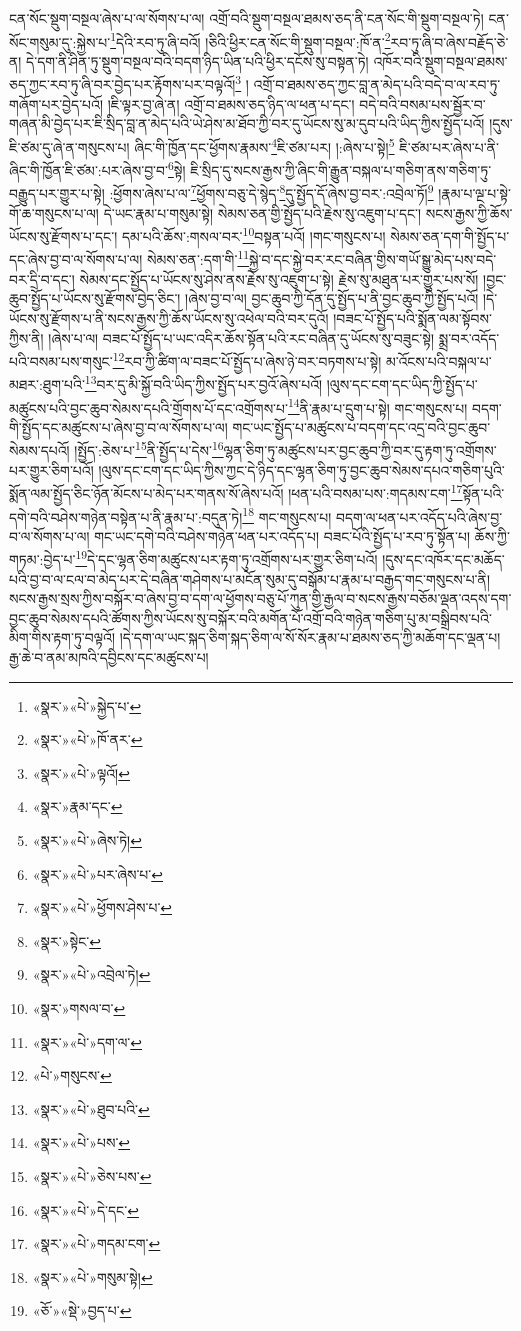 ངན་སོང་སྡུག་བསྔལ་ཞེས་པ་ལ་སོགས་པ་ལ། འགྲོ་བའི་སྡུག་བསྔལ་ཐམས་ཅད་ནི་ངན་སོང་གི་སྡུག་བསྔལ་ཏེ། ངན་སོང་གསུམ་དུ་:སྐྱེས་པ་\footnote{«སྣར་»«པེ་»སྐྱེད་པ་}དེའི་རབ་ཏུ་ཞི་བའོ། །ཅིའི་ཕྱིར་ངན་སོང་གི་སྡུག་བསྔལ་:ཁོ་ན་\footnote{«སྣར་»«པེ་»ཁོ་ནར་}རབ་ཏུ་ཞི་བ་ཞེས་བརྗོད་ཅེ་ན། དེ་དག་ནི་ཤིན་ཏུ་སྡུག་བསྔལ་བའི་བདག་ཉིད་ཡིན་པའི་ཕྱིར་དངོས་སུ་བསྟན་ཏེ། འཁོར་བའི་སྡུག་བསྔལ་ཐམས་ཅད་ཀྱང་རབ་ཏུ་ཞི་བར་བྱེད་པར་རྟོགས་པར་བལྟའོ།\footnote{«སྣར་»«པེ་»ལྟའོ།} །
འགྲོ་བ་ཐམས་ཅད་ཀྱང་བླ་ན་མེད་པའི་བདེ་བ་ལ་རབ་ཏུ་གཞོག་པར་བྱེད་པའོ། །ཇི་ལྟར་བྱ་ཞེ་ན། འགྲོ་བ་ཐམས་ཅད་ཉིད་ལ་ཕན་པ་དང་། བདེ་བའི་བསམ་པས་སྦྱོར་བ་གཞན་མི་བྱེད་པར་ཇི་སྲིད་བླ་ན་མེད་པའི་ཡེ་ཤེས་མ་ཐོབ་ཀྱི་བར་དུ་ཡོངས་སུ་མ་དུབ་པའི་ཡིད་ཀྱིས་སྤྱོད་པའོ། །དུས་ཇི་ཙམ་དུ་ཞེ་ན་གསུངས་པ། ཞིང་གི་ཁྱོན་དང་ཕྱོགས་རྣམས་\footnote{«སྣར་»རྣམ་དང་}ཇི་ཙམ་པར། །:ཞེས་པ་སྟེ།\footnote{«སྣར་»«པེ་»ཞེས་ཏེ།} ཇི་ཙམ་པར་ཞེས་པ་ནི་ཞིང་གི་ཁྱོན་ཇི་ཙམ་:པར་ཞེས་བྱ་བ་\footnote{«སྣར་»«པེ་»པར་ཞེས་པ་}སྟེ། ཇི་སྲིད་དུ་སངས་རྒྱས་ཀྱི་ཞིང་གི་རྒྱུན་བསྐལ་པ་གཅིག་ནས་གཅིག་ཏུ་བརྒྱུད་པར་གྱུར་པ་སྟེ། :ཕྱོགས་ཞེས་པ་ལ་\footnote{«སྣར་»«པེ་»ཕྱོགས་ཤེས་པ་}ཕྱོགས་བཅུ་དེ་སྙེད་\footnote{«སྣར་»སྟེང་}དུ་སྤྱོད་དོ་ཞེས་བྱ་བར་:འབྲེལ་ཏོ།\footnote{«སྣར་»«པེ་»འབྲེལ་ཏེ།} །རྣམ་པ་ལྔ་པ་སྟེ་གོ་ཆ་གསུངས་པ་ལ། དེ་ཡང་རྣམ་པ་གསུམ་སྟེ། སེམས་ཅན་གྱི་སྤྱོད་པའི་རྗེས་སུ་འཇུག་པ་དང་། སངས་རྒྱས་ཀྱི་ཆོས་ཡོངས་སུ་རྫོགས་པ་དང་། དམ་པའི་ཆོས་:གསལ་བར་\footnote{«སྣར་»གསལ་བ་}བསྟན་པའོ། །གང་གསུངས་པ། སེམས་ཅན་དག་གི་སྤྱོད་པ་དང་ཞེས་བྱ་བ་ལ་སོགས་པ་ལ། སེམས་ཅན་:དག་གི་\footnote{«སྣར་»«པེ་»དག་ལ་}སྐྱེ་བ་དང་སྐྱེ་བར་རང་བཞིན་གྱིས་གཡོ་སྒྱུ་མེད་པས་བདེ་བར་དྲི་བ་དང་། སེམས་དང་སྤྱོད་པ་ཡོངས་སུ་ཤེས་ནས་རྗེས་སུ་འཇུག་པ་སྟེ། རྗེས་སུ་མཐུན་པར་གྱུར་པས་སོ། །བྱང་ཆུབ་སྤྱོད་པ་ཡོངས་སུ་རྫོགས་བྱེད་ཅིང་། །ཞེས་བྱ་བ་ལ། བྱང་ཆུབ་ཀྱི་དོན་དུ་སྤྱོད་པ་ནི་བྱང་ཆུབ་ཀྱི་སྤྱོད་པའོ། །དེ་ཡོངས་སུ་རྫོགས་པ་ནི་སངས་རྒྱས་ཀྱི་ཆོས་ཡོངས་སུ་འཕེལ་བའི་བར་དུའོ། །བཟང་པོ་སྤྱོད་པའི་སྨོན་ལམ་སྟོབས་ཀྱིས་ནི། །ཞེས་པ་ལ། བཟང་པོ་སྤྱོད་པ་ཡང་འདིར་ཆོས་སྟོན་པའི་རང་བཞིན་དུ་ཡོངས་སུ་བཟུང་སྟེ། སྨྲ་བར་འདོད་པའི་བསམ་པས་གསུང་\footnote{«པེ་»གསུངས་}རབ་ཀྱི་ཚིག་ལ་བཟང་པོ་སྤྱོད་པ་ཞེས་ཉེ་བར་བཏགས་པ་སྟེ། མ་འོངས་པའི་བསྐལ་པ་མཐར་:ཐུག་པའི་\footnote{«སྣར་»«པེ་»ཐུབ་པའི་}བར་དུ་མི་སྐྱོ་བའི་ཡིད་ཀྱིས་སྤྱོད་པར་བྱའོ་ཞེས་པའོ། །ལུས་དང་ངག་དང་ཡིད་ཀྱི་སྤྱོད་པ་མཚུངས་པའི་བྱང་ཆུབ་སེམས་དཔའི་གྲོགས་པོ་དང་འགྲོགས་པ་\footnote{«སྣར་»«པེ་»པས་}ནི་རྣམ་པ་དྲུག་པ་སྟེ། གང་གསུངས་པ། བདག་གི་སྤྱོད་དང་མཚུངས་པ་ཞེས་བྱ་བ་ལ་སོགས་པ་ལ། གང་ཡང་སྤྱོད་པ་མཚུངས་པ་བདག་དང་འདྲ་བའི་བྱང་ཆུབ་སེམས་དཔའོ། །སྤྱོད་:ཅེས་པ་\footnote{«སྣར་»«པེ་»ཅེས་པས་}ནི་སྤྱོད་པ་དེས་\footnote{«སྣར་»«པེ་»དེ་དང་}ལྷན་ཅིག་ཏུ་མཚུངས་པར་བྱང་ཆུབ་ཀྱི་བར་དུ་རྟག་ཏུ་འགྲོགས་པར་གྱུར་ཅིག་པའོ། །ལུས་དང་ངག་དང་ཡིད་ཀྱིས་ཀྱང་དེ་ཉིད་དང་ལྷན་ཅིག་ཏུ་བྱང་ཆུབ་སེམས་དཔའ་གཅིག་པུའི་སྨོན་ལམ་སྤྱོད་ཅིང་ཉོན་མོངས་པ་མེད་པར་གནས་སོ་ཞེས་པའོ། །ཕན་པའི་བསམ་པས་:གདམས་ངག་\footnote{«སྣར་»«པེ་»གདམ་ངག་}སྟོན་པའི་དགེ་བའི་བཤེས་གཉེན་བསྟེན་པ་ནི་རྣམ་པ་:བདུན་ཏེ།\footnote{«སྣར་»«པེ་»གསུམ་སྟེ།} གང་གསུངས་པ། བདག་ལ་ཕན་པར་འདོད་པའི་ཞེས་བྱ་བ་ལ་སོགས་པ་ལ། གང་ཡང་དགེ་བའི་བཤེས་གཉེན་ཕན་པར་འདོད་པ། བཟང་པོའི་སྤྱོད་པ་རབ་ཏུ་སྟོན་པ། ཆོས་ཀྱི་གཏམ་:བྱེད་པ་\footnote{«ཅོ་»«སྡེ་»བྱད་པ་}དེ་དང་ལྷན་ཅིག་མཚུངས་པར་རྟག་ཏུ་འགྲོགས་པར་གྱུར་ཅིག་པའོ། །དུས་དང་འཁོར་དང་མཆོད་པའི་བྱ་བ་ལ་ངལ་བ་མེད་པར་དེ་བཞིན་གཤེགས་པ་མངོན་སུམ་དུ་བསྒོམ་པ་རྣམ་པ་བརྒྱད་གང་གསུངས་པ་ནི། སངས་རྒྱས་སྲས་ཀྱིས་བསྐོར་བ་ཞེས་བྱ་བ་དག་ལ་ཕྱོགས་བཅུ་པོ་ཀུན་གྱི་རྒྱལ་བ་སངས་རྒྱས་བཅོམ་ལྡན་འདས་དག་བྱང་ཆུབ་སེམས་དཔའི་ཚོགས་ཀྱིས་ཡོངས་སུ་བསྐོར་བའི་མགོན་པོ་འགྲོ་བའི་གཉེན་གཅིག་པུ་མ་བསྒྲིབས་པའི་མིག་གིས་རྟག་ཏུ་བལྟའོ། །དེ་དག་ལ་ཡང་སྐད་ཅིག་སྐད་ཅིག་ལ་སོ་སོར་རྣམ་པ་ཐམས་ཅད་ཀྱི་མཆོག་དང་ལྡན་པ། རྒྱ་ཆེ་བ་ནམ་མཁའི་དབྱིངས་དང་མཚུངས་པ། 